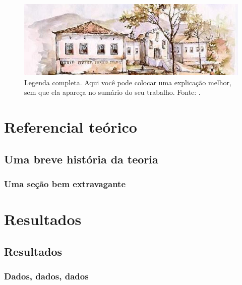 \documentclass[
	12pt,				%
	openright,			%
	twoside,			%
	a4paper,			%
	english,			%
	brazil				%
	]{abntex2}
\begin{document}
\begin{figure}[htbp]
	\centering
	\includegraphics[scale=0.4]{ichs2.jpg} %
	\caption[Legenda reduzida - aparece no sumário]{Legenda completa. Aqui você pode colocar uma explicação melhor, sem que ela apareça no sumário do seu trabalho. Fonte: \cite[p.~117]{boyle1772}.}
	\label{fig:309}
\end{figure}
\part{Referencial teórico}
\chapter{Uma breve história da teoria}

\section{Uma seção bem extravagante}

\lipsum[1]

\lipsum[2-3]
\part{Resultados}
\chapter{Resultados}

\section{Dados, dados, dados}
\lipsum[21-22]
\end{document}
